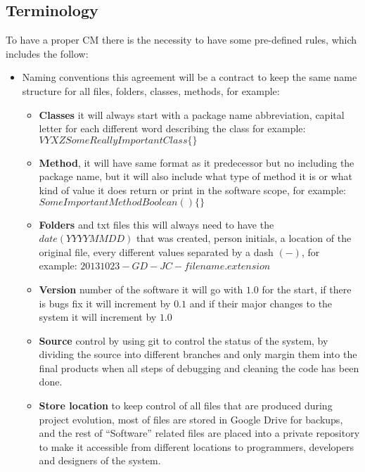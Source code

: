 \subsection*{Terminology}
To have a proper CM there is the necessity to have some pre-defined rules, which includes the follow:

\begin{itemize}
	\item Naming conventions this agreement will be a contract to keep the same name structure for all files, folders, classes, methods, for example:
	\begin{itemize}
		
		\item \textbf{Classes} it will always start with a package name abbreviation, capital letter for each different word describing the class for example: $VYXZSomeReallyImportantClass\{\}$
		
		\item \textbf{Method}, it will have same format as it predecessor but no including the package name, but it will also include what type of method it is or what kind of value it does return or print in the software scope, for example: $SomeImportantMethodBoolean()\{\}$
		
		\item \textbf{Folders} and txt files  this will always need to have the $date(YYYYMMDD)$ that was created, person initials, a location of the original file, every different values separated by a dash $(-)$, for example: $20131023-GD-JC-filename.extension$
		
		\item \textbf{Version} number of the software it will go with $1.0$ for the start, if there is bugs fix it will increment by $0.1$ and if their major changes to the system it will increment by $1.0$
		
		\item \textbf{Source} control by using git to control the status of the system, by dividing the source into different branches and only margin them into the final products when all steps of debugging and cleaning the code has been done.
		
		\item \textbf{Store location} to keep control of all files that are produced during project evolution, most of files are stored in Google Drive for backups, and the rest of “Software” related files are placed into a private repository to make it accessible from different locations to programmers, developers and designers of the system.
		
	\end{itemize}
\end{itemize}


